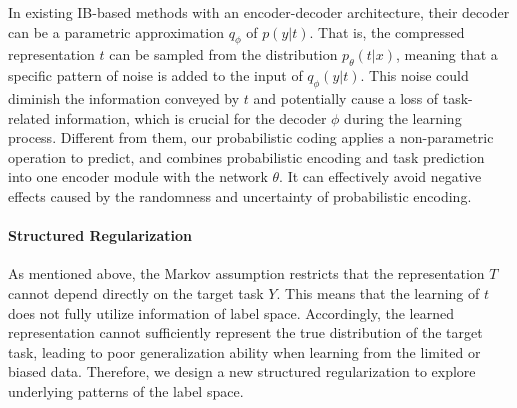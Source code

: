 \documentclass[letterpaper]{article} %
\begin{document}
In existing IB-based methods \cite{DBLP:conf/iclr/AlemiFD017,DBLP:journals/entropy/Fischer20,DBLP:conf/cvpr/AnJC23} with an encoder-decoder architecture, their decoder can be a parametric approximation $q_{\phi}$ of $p(y|t)$. That is, the compressed representation $t$ can be sampled from the distribution $p_{\theta}(t|x)$, meaning that a specific pattern of noise is added to the input of $q_{\phi}(y|t)$. This noise could diminish the information conveyed by $t$ and potentially cause a loss of task-related information, which is crucial for the decoder $\phi$ during the learning process.
Different from them, our probabilistic coding applies a non-parametric operation to predict, and combines probabilistic encoding and task prediction into one encoder module with the network $\theta$. It can effectively avoid negative effects caused by the randomness and uncertainty of probabilistic encoding.



\paragraph{Structured Regularization}
As mentioned above, the Markov assumption restricts that the representation $T$ cannot depend directly on the target task $Y$.
This means that the learning of $t$ does not fully utilize information of label space.
Accordingly, the learned representation cannot sufficiently represent the true distribution of the target task, leading to poor generalization ability when learning from the limited or biased data.
Therefore, we design a new structured regularization to explore underlying patterns of the label space.
\end{document}
